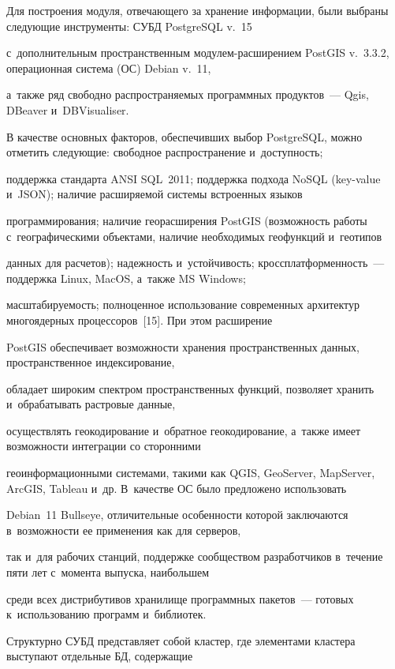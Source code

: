   Для построения модуля, отвечающего за хранение информации, были выбраны сле\-ду\-ющие инструменты: СУБД PostgreSQL v.~15 

  с~дополнительным пространственным мо\-ду\-лем-рас\-ши\-ре\-ни\-ем PostGIS v.~3.3.2, операционная система (ОС) Debian v.~11, 

  а~также ряд свободно распространяемых программных продуктов~--- Qgis, DBeaver и~DBVisualiser.

  

  В качестве основных факторов, обеспечивших выбор PostgreSQL, мож\-но отметить сле\-ду\-ющие: свободное распространение и~до\-ступ\-ность; 

  поддержка стандарта ANSI SQL~2011; поддержка подхода NoSQL (key-value и~JSON); наличие расширяемой сис\-те\-мы встроенных языков 

  программирования; наличие георасширения PostGIS (возможность работы с~географическими объектами, наличие необходимых геофункций и~геотипов 

  данных для расчетов); на\-деж\-ность и~устой\-чи\-вость; кроссплатформенность~--- поддержка Linux, MacOS, а~также MS Windows; 

  мас\-шта\-би\-ру\-емость; полноценное использование современных архитектур многоядерных процессоров~[15]. При этом расширение

   PostGIS обеспечивает возможности хранения пространственных данных, пространственное индексирование, 

   обладает широким спект\-ром пространственных функций, поз\-во\-ля\-ет хранить и~обрабатывать растровые данные, 

   осуществлять геокодирование и~обратное геокодирование, а~также имеет возможности интеграции со сторонними 

   геоинформационными сис\-те\-ма\-ми, такими как QGIS, GeoServer, MapServer, ArcGIS, Tableau и~др. В~качестве ОС было предложено использовать 

   Debian~11 Bullseye, отличительные особенности которой заключаются в~воз\-мож\-ности ее применения как для серверов, 

   так и~для рабочих станций, поддержке сообществом разработчиков в~течение пяти лет с~момента выпуска, наибольшем 

   среди всех дистрибутивов хранилище программных пакетов~--- готовых к~использованию программ и~библиотек.

  

  Структурно СУБД представляет собой кластер, где элементами кластера выступают отдельные БД, содержащие 

